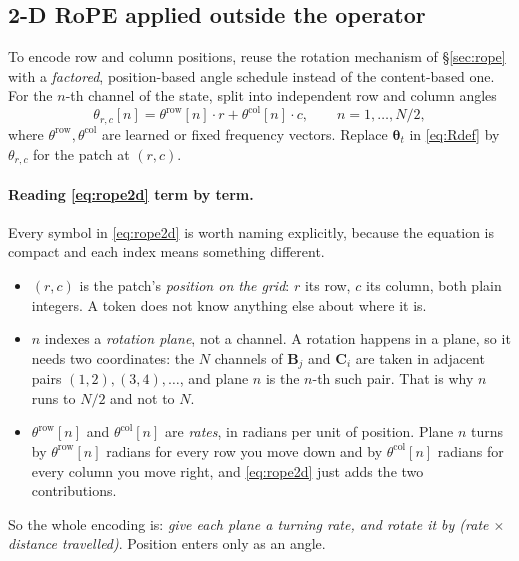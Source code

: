 \documentclass[11pt,a4paper]{article}
\begin{document}
\subsection{2-D RoPE applied outside the operator}\label{sec:2drope}
\label{sec:rope2d}

To encode row and column positions, reuse the rotation mechanism of
\S\ref{sec:rope} with a \emph{factored}, position-based angle schedule instead of
the content-based one. For the
$n$-th channel of the state, split into independent row and column
angles
\begin{equation}\label{eq:rope2d}
  \theta_{r,c}[n] = \theta^{\text{row}}[n]\cdot r + \theta^{\text{col}}[n]\cdot c,
  \qquad n = 1,\dots,N/2,
\end{equation}
where $\theta^{\text{row}},\theta^{\text{col}}$ are learned or fixed
frequency vectors. Replace $\bm{\theta}_t$ in \eqref{eq:Rdef} by
$\theta_{r,c}$ for the patch at $(r,c)$.

\paragraph{Reading \eqref{eq:rope2d} term by term.}
Every symbol in \eqref{eq:rope2d} is worth naming explicitly, because the
equation is compact and each index means something different.

\begin{itemize}
  \item $(r,c)$ is the patch's \emph{position on the grid}: $r$ its row, $c$ its
        column, both plain integers. A token does not know anything else about
        where it is.
  \item $n$ indexes a \emph{rotation plane}, not a channel. A rotation happens
        in a plane, so it needs two coordinates: the $N$ channels of $\bm{B}_j$
        and $\bm{C}_i$ are taken in adjacent pairs
        $(1,2),(3,4),\dots$, and plane $n$ is the $n$-th such pair. That is why
        $n$ runs to $N/2$ and not to $N$.
  \item $\theta^{\text{row}}[n]$ and $\theta^{\text{col}}[n]$ are \emph{rates}, in
        radians per unit of position. Plane $n$ turns by
        $\theta^{\text{row}}[n]$ radians for every row you move down and by
        $\theta^{\text{col}}[n]$ radians for every column you move right, and
        \eqref{eq:rope2d} just adds the two contributions.
\end{itemize}

\noindent So the whole encoding is: \emph{give each plane a turning rate, and
rotate it by (rate $\times$ distance travelled)}. Position enters only as an
angle.
\end{document}
